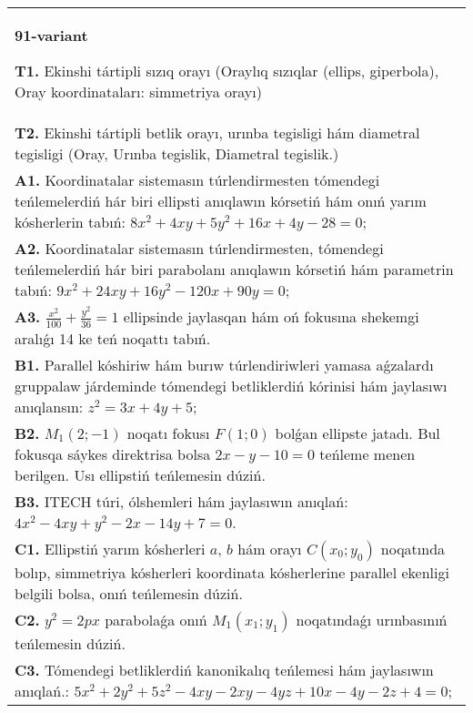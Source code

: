 \documentclass{article}
\begin{document}
\begin{tabular}{m{17cm}}
\textbf{91-variant}
\newline

\textbf{T1.} Ekinshi tártipli sızıq orayı (Oraylıq sızıqlar (ellips, giperbola), Oray koordinataları: simmetriya orayı) \\
\textbf{T2.} Ekinshi tártipli betlik orayı, urınba tegisligi hám diametral tegisligi (Oray, Urınba tegislik, Diametral tegislik.) \\
\textbf{A1.} Koordinatalar sistemasın túrlendirmesten tómendegi teńlemelerdiń hár biri ellipsti anıqlawın kórsetiń hám onıń yarım kósherlerin tabıń: $8 x^2+4 x y+5 y^2+16 x+4 y-28=0$; \\
\textbf{A2.} Koordinatalar sistemasın túrlendirmesten, tómendegi teńlemelerdiń hár biri parabolanı anıqlawın kórsetiń hám parametrin tabıń: $9 x^2+24 x y+16 y^2-120 x+90 y=0$; \\
\textbf{A3.} $\frac{x^2}{100}+\frac{y^2}{36}=1$ ellipsinde jaylasqan hám oń fokusına shekemgi aralıǵı 14 ke teń noqattı tabıń. \\
\textbf{B1.} Parallel kóshiriw hám burıw túrlendiriwleri yamasa aǵzalardı gruppalaw járdeminde tómendegi betliklerdiń kórinisi hám jaylasıwı anıqlansın: $z^2=3 x+4 y+5$; \\
\textbf{B2.} $M_1 (2;-1) $ noqatı fokusı $F (1;0) $ bolǵan ellipste jatadı. Bul fokusqa sáykes direktrisa bolsa $2x-y-10=0$ teńleme menen berilgen. Usı ellipstiń teńlemesin dúziń. \\
\textbf{B3.} ITECH túri, ólshemleri hám jaylasıwın anıqlań: $4 x^2-4 x y+y^2-2 x-14 y+7=0$. \\
\textbf{C1.} Ellipstiń yarım kósherleri $a$, $b$ hám orayı $C\left(x_0; y_0\right) $ noqatında bolıp, simmetriya kósherleri koordinata kósherlerine parallel ekenligi belgili bolsa, onıń teńlemesin dúziń. \\
\textbf{C2.} $y^2=2 p x$ parabolaǵa onıń $M_1\left(x_1; y_1\right) $ noqatındaǵı urınbasınıń teńlemesin dúziń. \\
\textbf{C3.} Tómendegi betliklerdiń kanonikalıq teńlemesi hám jaylasıwın anıqlań.: $5 x^2+2 y^2+5 z^2-4 x y-2 x y-4 y z+10 x-4 y-2 z+4=0$; \\

\end{tabular}
\vspace{1cm}
\end{document}
